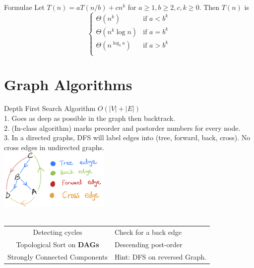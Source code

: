 \documentclass[10pt,a4paper]{article}
\begin{document}
\begin{multicols}{3}
\begin{textbox}{Formulae}
 Let $T(n) = aT(n/b) + cn^k$ for $a \geq 1, b \geq 2, c, k \geq 0$. Then $T(n)$ is 
\[\begin{cases}
    \Theta(n^k) & \text{if $a < b^k$}\\
    \Theta(n^k \log n) & \text{if $a = b^k$}\\
    \Theta(n^{\log_b a}) & \text{if $a > b^k$}\\
\end{cases}\]
\end{textbox}

\section{Graph Algorithms}
\begin{textbox}{Depth First Search Algorithm}
      $O(|V| + |E|)$ \\
    1. Goes as deep as possible in the graph then backtrack.\\
    2. (In-class algorithm) marks preorder and postorder numbers for every node. \\
    3. In a directed graphs, DFS will label edges into (tree, forward, back, cross). No cross edges in undirected graphs.\\
    \includegraphics[width=0.4\textwidth]{images/dfs-edges.jpeg}\\
    \\
    \begin{tabular}{c|p{}}
         Detecting cycles & Check for a back edge \\
         Topological Sort on {\bf DAGs} & Descending post-order\\
        Strongly Connected Components & Hint: DFS on reversed Graph.\\
   \end{tabular}\\
\end{textbox}


\end{multicols}
\end{document}
